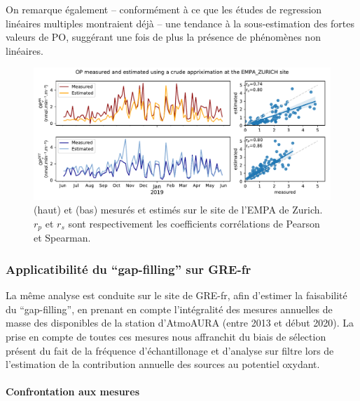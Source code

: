 On remarque également -- conformément à ce que les études de regression linéaires
multiples montraient déjà -- une tendance à la sous-estimation des fortes valeurs de PO,
suggérant une fois de plus la présence de phénomènes non linéaires.

\begin{figure}[ht]
    \centering
    \includegraphics[width=1.0\linewidth]{figures/chapter05/pyopestimator_EMPA_ZURICH.pdf}
    \caption{\POAAv{} (haut) et \PODTTv{} (bas) mesurés et estimés sur le site de l'EMPA
    de Zurich. $r_p$ et $r_s$ sont respectivement les coefficients corrélations de Pearson
et Spearman.}
    \label{fig:figures/chapter05/pyopestimator_EMPA_ZURICH}
\end{figure}

%  

\subsubsection{Applicatibilité du ``gap-filling'' sur GRE-fr}

La même analyse est conduite sur le site de GRE-fr, afin d'estimer la faisabilité du
``gap-filling'', en prenant en compte l'intégralité des mesures annuelles de masse des
\PMdix{} disponibles de la station d'AtmoAURA (entre 2013 et début 2020). La prise en compte de toutes ces mesures
nous affranchit du biais de sélection présent du fait de la fréquence d'échantillonage et
d'analyse sur filtre lors de l'estimation de la contribution annuelle des sources au
potentiel oxydant.

\paragraph{Confrontation aux mesures}%
\label{par:confrontation_aux_mesures}

